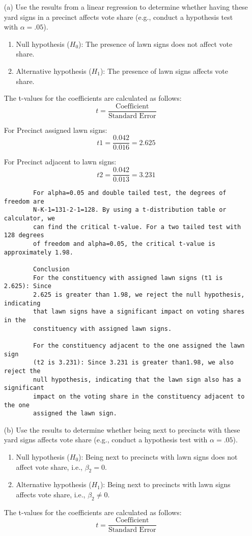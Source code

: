 \documentclass[12pt,letterpaper]{article}
\begin{document}
\vspace{.5cm}
\begin{enumerate}
	\item [(a)] Use the results from a linear regression to determine whether having these yard signs in a precinct affects vote share (e.g., conduct a hypothesis test with $\alpha = .05$).
	
		\begin{enumerate}
			\item Null hypothesis (\(H_0\)): The presence of lawn signs does not affect vote share.
			\item Alternative hypothesis (\(H_1\)): The presence of lawn signs affects vote share.
		\end{enumerate}
		
		The t-values for the coefficients are calculated as follows:
		\[ t = \frac{\text{Coefficient}}{\text{Standard Error}} \]
		
		For Precinct assigned lawn signs:
		\[ t1 = \frac{0.042}{0.016} = 2.625 \]
		
		For Precinct adjacent to lawn signs:
		\[ t2 = \frac{0.042}{0.013} = 3.231 \]
		
		
		\begin{verbatim}
		For alpha=0.05 and double tailed test, the degrees of freedom are 
		N-K-1=131-2-1=128. By using a t-distribution table or calculator, we 
		can find the critical t-value. For a two tailed test with 128 degrees 
		of freedom and alpha=0.05, the critical t-value is approximately 1.98.
		
		Conclusion
		For the constituency with assigned lawn signs (t1 is 2.625): Since 
		2.625 is greater than 1.98, we reject the null hypothesis, indicating 
		that lawn signs have a significant impact on voting shares in the 
		constituency with assigned lawn signs.
		
		For the constituency adjacent to the one assigned the lawn sign 
		(t2 is 3.231): Since 3.231 is greater than1.98, we also reject the 
		null hypothesis, indicating that the lawn sign also has a significant 
		impact on the voting share in the constituency adjacent to the one 
		assigned the lawn sign.
		\end{verbatim}
		

	\newpage		
	\item [(b)]  Use the results to determine whether being
	next to precincts with these yard signs affects vote
	share (e.g., conduct a hypothesis test with $\alpha = .05$).

	\begin{enumerate}
		\item Null hypothesis (\(H_0\)): Being next to precincts with lawn signs does not affect vote share, i.e., \(\beta_2 = 0\).
		\item Alternative hypothesis (\(H_1\)): Being next to precincts with lawn signs affects vote share, i.e., \(\beta_2 \neq 0\).
	\end{enumerate}
	The t-values for the coefficients are calculated as follows:
	\[ t = \frac{\text{Coefficient}}{\text{Standard Error}} \]
	

\end{enumerate}
\end{document}
